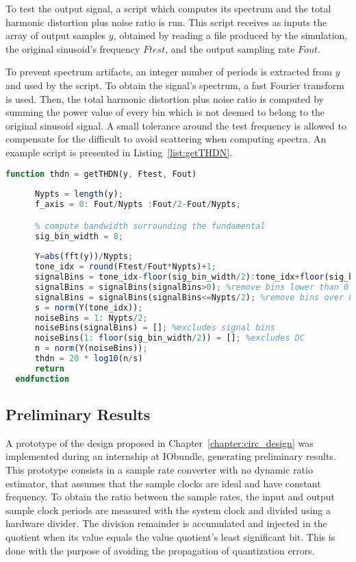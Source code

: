 To test the output signal, a script which computes its spectrum and the total
harmonic distortion plus noise ratio is run.  This script receives as inputs the
array of output samples $y$, obtained by reading a file produced by the
simulation, the original sinusoid's frequency $Ftest$, and the output sampling
rate $Fout$.

To prevent spectrum artifacts, an integer number of periods is extracted from
$y$ and used by the script. To obtain the signal's spectrum, a fast Fourier
transform is used.  Then, the total harmonic distortion plus noise ratio is
computed by summing the power value of every bin which is not deemed to belong to
the original sinusoid signal. A small tolerance around the test frequency is
allowed to compensate for the difficult to avoid scattering when computing
spectra. An example script is presented in Listing~\ref{list:getTHDN}.

\begin{lstlisting}[language=Octave, caption={Output analysis script}, label={list:getTHDN}, frame=single, breaklines=true]
  function thdn = getTHDN(y, Ftest, Fout)
  
      Nypts = length(y);
      f_axis = 0: Fout/Nypts :Fout/2-Fout/Nypts;

      % compute bandwidth surrounding the fundamental
      sig_bin_width = 8; 
  
      Y=abs(fft(y))/Nypts;
      tone_idx = round(Ftest/Fout*Nypts)+1;
      signalBins = tone_idx-floor(sig_bin_width/2):tone_idx+floor(sig_bin_width/2);
      signalBins = signalBins(signalBins>0); %remove bins lower than 0
      signalBins = signalBins(signalBins<=Nypts/2); %remove bins over FFTpoints/2
      s = norm(Y(tone_idx)); 
      noiseBins = 1: Nypts/2;
      noiseBins(signalBins) = []; %excludes signal bins
      noiseBins(1: floor(sig_bin_width/2)) = []; %excludes DC 
      n = norm(Y(noiseBins));
      thdn = 20 * log10(n/s)
      return
  endfunction
\end{lstlisting}

\subsection{Preliminary Results}
\label{subsection:prel_res}

A prototype of the design proposed in Chapter~\ref{chapter:circ_design} was
implemented during an internship at IObundle, generating preliminary
results. This prototype consists in a sample rate converter with no dynamic ratio
estimator, that assumes that the sample clocks are ideal and have constant
frequency. To obtain the ratio between the sample rates, the input and output
sample clock periods are measured with the system clock and divided using a
hardware divider. The division remainder is accumulated and injected in the
quotient when its value equals the value quotient's least significant bit. This
is done with the purpose of avoiding the propagation of quantization errors.

